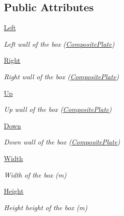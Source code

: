 \subsection*{Public Attributes}
\begin{DoxyCompactItemize}
\item 
\hyperlink{classgebtaero_1_1_composite_box_1_1_composite_box_a7bfe2dab84e5ae8d8cdba1337b89c309}{Left}
\begin{DoxyCompactList}\small\item\em Left wall of the box (\hyperlink{namespacegebtaero_1_1_composite_plate}{Composite\+Plate}) \end{DoxyCompactList}\item 
\hyperlink{classgebtaero_1_1_composite_box_1_1_composite_box_a61cdca93cc1f5ef451192395fc50b67b}{Right}
\begin{DoxyCompactList}\small\item\em Right wall of the box (\hyperlink{namespacegebtaero_1_1_composite_plate}{Composite\+Plate}) \end{DoxyCompactList}\item 
\hyperlink{classgebtaero_1_1_composite_box_1_1_composite_box_a4c043150a29d71b986a91f21be6a4e47}{Up}
\begin{DoxyCompactList}\small\item\em Up wall of the box (\hyperlink{namespacegebtaero_1_1_composite_plate}{Composite\+Plate}) \end{DoxyCompactList}\item 
\hyperlink{classgebtaero_1_1_composite_box_1_1_composite_box_ad1559917cabe3fcb6c05bf603d8b0b0c}{Down}
\begin{DoxyCompactList}\small\item\em Down wall of the box (\hyperlink{namespacegebtaero_1_1_composite_plate}{Composite\+Plate}) \end{DoxyCompactList}\item 
\hyperlink{classgebtaero_1_1_composite_box_1_1_composite_box_a44593d7302ceb1c46ac637437b5e1061}{Width}
\begin{DoxyCompactList}\small\item\em Width of the box (m) \end{DoxyCompactList}\item 
\hyperlink{classgebtaero_1_1_composite_box_1_1_composite_box_affc2b38183c3b0ec7534629cf63e4cc5}{Height}
\begin{DoxyCompactList}\small\item\em Height height of the box (m) \end{DoxyCompactList}\item 

\end{DoxyCompactItemize}
